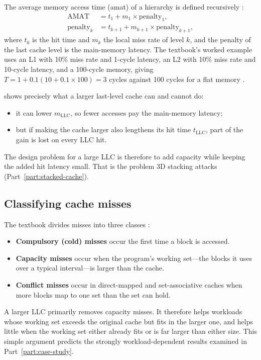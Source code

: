 The average memory access time (\gls{amat}) of a hierarchy is defined recursively \cite[sec.~11.3.1]{sarangi2025basic}:
\begin{equation}
\begin{aligned}
  \mathrm{AMAT} &= t_1 + m_1 \times \mathrm{penalty}_1,\\
  \mathrm{penalty}_{k} &= t_{k+1} + m_{k+1} \times \mathrm{penalty}_{k+1},
\end{aligned}
\label{eq:amat}
\end{equation}
where $t_k$ is the hit time and $m_k$ the local miss rate of level $k$, and the penalty of the last cache level is the main-memory latency. The textbook's worked example uses an L1 with 10\% miss rate and 1-cycle latency, an L2 with 10\% miss rate and 10-cycle latency, and a 100-cycle memory, giving $T = 1 + 0.1(10 + 0.1\times100) = 3$ cycles against 100 cycles for a flat memory \cite[sec.~11.1.7, Example~147]{sarangi2025basic}.

 shows precisely what a larger last-level cache can and cannot do:
\begin{itemize}
  \item it can lower $m_{\mathrm{LLC}}$, so fewer accesses pay the main-memory latency;
  \item but if making the cache larger also lengthens its hit time $t_{\mathrm{LLC}}$, part of the gain is lost on every LLC hit.
\end{itemize}
The design problem for a large LLC is therefore to add capacity while keeping the added hit latency small. That is the problem 3D stacking attacks (Part~\ref{part:stacked-cache}).

\subsection{Classifying cache misses}
\label{sec:miss-classes}

The textbook divides misses into three classes \cite[sec.~11.3.2]{sarangi2025basic}:
\begin{itemize}
  \item \textbf{Compulsory (cold) misses} occur the first time a block is accessed.
  \item \textbf{Capacity misses} occur when the program's working set---the blocks it uses over a typical interval---is larger than the cache.
  \item \textbf{Conflict misses} occur in direct-mapped and set-associative caches when more blocks map to one set than the set can hold.
\end{itemize}
A larger LLC primarily removes capacity misses. It therefore helps workloads whose working set exceeds the original cache but fits in the larger one, and helps little when the working set either already fits or is far larger than either size. This simple argument predicts the strongly workload-dependent results examined in Part~\ref{part:case-study}.

